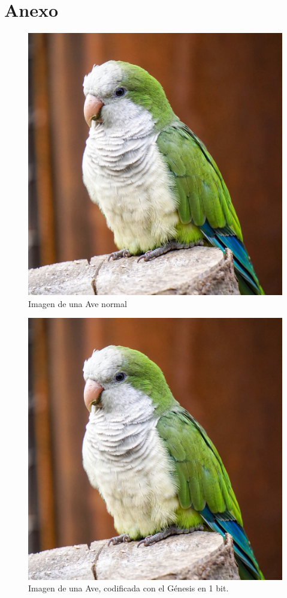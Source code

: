 \documentclass[conference]{IEEEtran}
\begin{document}
\section*{Anexo}
    \begin{figure}[H]
    \centering
    \includegraphics[width=0.9\linewidth]{image/birb.png}
\caption{Imagen de una Ave normal}
\end{figure}

    
    \begin{figure}[H]
    \centering
    \includegraphics[width=0.9\linewidth]{image/birb1.png}
\caption{Imagen de una Ave, codificada con el Génesis en 1 bit.}
\end{figure}
\end{document}
